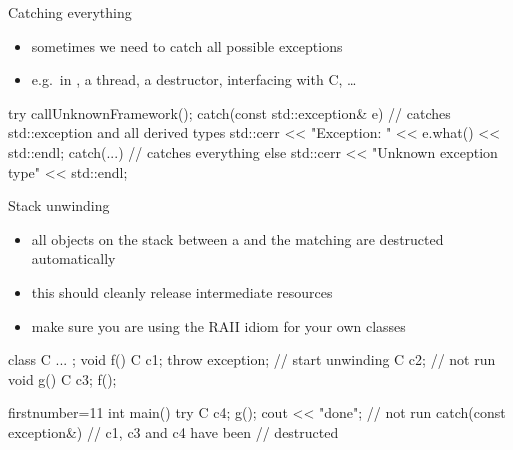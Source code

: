 \begin{frame}[fragile]
  \begin{block}{Catching everything}
    \begin{itemize}
    \item sometimes we need to catch all possible exceptions
    \item e.g.\ in , a thread, a destructor, interfacing with C, \ldots
    \end{itemize}
  \end{block}
  \begin{cppcode}

    try {
      callUnknownFramework();
    } catch(const std::exception& e) {
      // catches std::exception and all derived types
      std::cerr << "Exception: " << e.what() << std::endl;
    } catch(...) {
      // catches everything else
      std::cerr << "Unknown exception type" << std::endl;
    }
  \end{cppcode}
\end{frame}

\begin{frame}[fragile]
  \begin{block}{Stack unwinding}
    \begin{itemize}
      \item all objects on the stack between a  and the matching  are destructed automatically
      \item this should cleanly release intermediate resources
      \item make sure you are using the RAII idiom for your own classes
    \end{itemize}
  \end{block}
  \begin{multicols}{2}
    \begin{cppcode*}{}
      class C { ... };
      void f() {
        C c1;
        throw exception{};
          // start unwinding
        C c2; // not run
      }
      void g() {
        C c3; f();
      }
    \end{cppcode*}
    \columnbreak
    \begin{cppcode*}{firstnumber=11}
      int main() {
        try {
          C c4;
          g();
          cout << "done"; // not run
        } catch(const exception&) {
          // c1, c3 and c4 have been
          // destructed
        }
      }
    \end{cppcode*}
  \end{multicols}
\end{frame}

